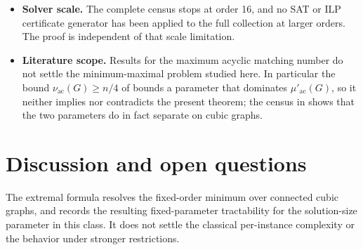 \documentclass[smallextended,natbib,nospthms]{svjour3}
\theoremstyle{definition}
\theoremstyle{remark}
\newcommand{\acnum}{\mu'_{\mathrm{ac}}}
\newcommand{\maxacnum}{\nu_{\mathrm{ac}}}
\begin{document}
\begin{itemize}[leftmargin=1.5em]
  \item \textbf{Solver scale.}
  The complete census stops at order 16, and no SAT or ILP certificate
  generator has been applied to the full collection at larger orders. The
  proof is independent of that scale limitation.

  \item \textbf{Literature scope.}
  Results for the maximum acyclic matching number do not settle the
  minimum-maximal problem studied here. In particular the bound
  $\maxacnum(G)\geq n/4$ of \cite{FurstRautenbach2018} bounds a parameter that
  dominates $\acnum(G)$, so it neither implies nor contradicts the present
  theorem; the census in  shows that the two parameters do in
  fact separate on cubic graphs.
\end{itemize}

\section{Discussion and open questions}
\label{sec:discussion}

The extremal formula resolves the fixed-order minimum over connected cubic
graphs, and  records the resulting fixed-parameter
tractability for the solution-size parameter in this class. It does not settle
the classical per-instance complexity or the behavior under stronger
restrictions.
\end{document}

